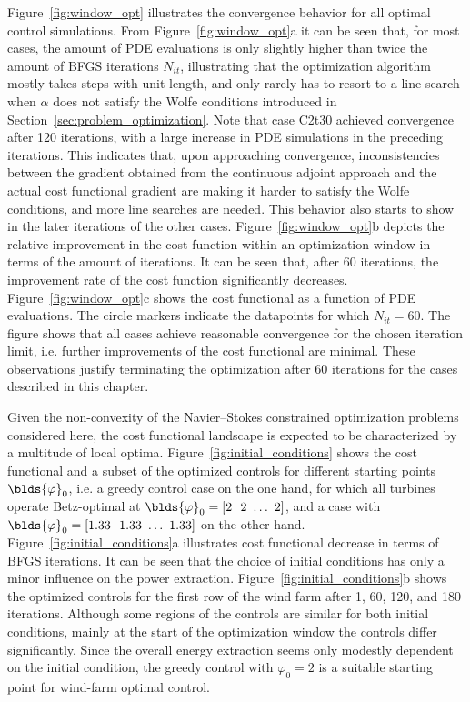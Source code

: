 Figure~\ref{fig:window_opt} illustrates the convergence behavior for all optimal control simulations. From Figure~\ref{fig:window_opt}a it can be seen that, for most cases, the amount of PDE evaluations is only slightly higher than twice the amount of BFGS iterations $N_{it}$, illustrating that the optimization algorithm mostly takes steps with unit length, and only rarely has to resort to a line search when $\alpha$ does not satisfy the Wolfe conditions introduced in Section~\ref{sec:problem_optimization}. Note that case C2t30 achieved convergence after 120 iterations, with a large increase in PDE simulations in the preceding iterations. This indicates that, upon approaching convergence, inconsistencies between the gradient obtained from the continuous adjoint approach and the actual cost functional gradient are making it harder to satisfy the Wolfe conditions, and more line searches are needed. This behavior also starts to show in the later iterations of the other cases. Figure~\ref{fig:window_opt}b depicts the relative improvement in the cost function within an optimization window in terms of the amount of iterations. It can be seen that, after 60 iterations, the improvement rate of the cost function significantly decreases. Figure~\ref{fig:window_opt}c shows the cost functional as a function of PDE evaluations. The circle markers indicate the datapoints for which $N_{it} = 60$. The figure shows that all cases achieve reasonable convergence for the chosen iteration limit, i.e. further improvements of the cost functional are minimal. These observations justify terminating the optimization after 60 iterations for the cases described in this chapter. 
	
	
Given the non-convexity of the Navier--Stokes constrained optimization problems considered here, the cost functional landscape is expected to be characterized by a multitude of local optima. Figure~\ref{fig:initial_conditions} shows the cost functional and a subset of the optimized controls for different starting points $\blds{\varphi}_0$, i.e. a greedy control case on the one hand, for which all turbines operate Betz-optimal at $\blds{\varphi}_0 = [2 \ \ 2 \ \dots \ 2]$, and a case with $\blds{\varphi}_0 = [1.33 \ \ 1.33 \ \dots \ 1.33]$ on the other hand. Figure~\ref{fig:initial_conditions}a illustrates cost functional decrease in terms of BFGS iterations. It can be seen that the choice of initial conditions has only a minor influence on the power extraction. Figure~\ref{fig:initial_conditions}b shows the optimized controls for the first row of the wind farm after 1, 60, 120, and 180 iterations. Although some regions of the controls are similar for both initial conditions, mainly at the start of the optimization window the controls differ significantly. Since the overall energy extraction seems only modestly dependent on the initial condition, the greedy control with $\varphi_0 = 2$ is a suitable starting point for wind-farm optimal control.

